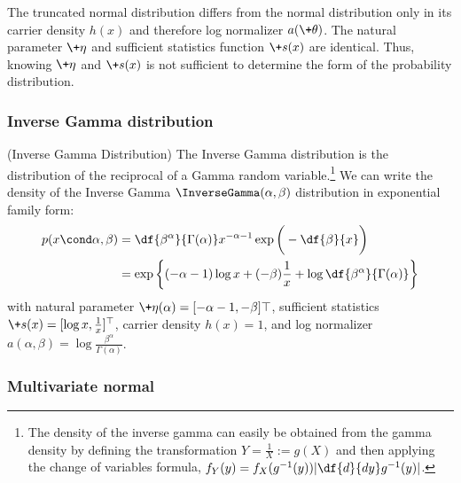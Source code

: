 \documentclass{article} %
\newcommand{\logNormalizerFunction}{a}
\newcommand{\sufficientStatsFunction}{\+s}
\newcommand{\carrierDensity}{h}
\newcommand{\param}{\+\theta}
\newcommand{\naturalParam}{\+\eta}
\begin{document}
\begin{remark}
The truncated normal distribution differs from the normal distribution only in its carrier density $\carrierDensity(x)$ and therefore log normalizer $\logNormalizerFunction(\param)$.  The natural parameter $\naturalParam$ and sufficient statistics function $\sufficientStatsFunction(x)$ are identical.   Thus,  knowing $\naturalParam$ and $\sufficientStatsFunction(x)$ is not sufficient to determine the form of the probability distribution.
\label{rk:truncated_normal_differs_from_normal_only_in_terms_of_carrier_density}
\end{remark}


\subsubsection{Inverse Gamma distribution}

\begin{example}{(Inverse Gamma Distribution)} 
\label{ex:inverse_gamma_as_ef} The Inverse Gamma distribution is the distribution of the reciprocal of a Gamma random variable.\footnote{The density of the inverse gamma can easily be obtained from the gamma density by defining the transformation $Y = \frac{1}{X} := g(X)$ and then applying the change of variables formula,  $f_Y(y) = f_X (g^{-1}(y)) | \df{d}{dy} g^{-1}(y)|$.}  We can write the density of the Inverse Gamma $\InverseGamma(\alpha,  \beta)$ distribution in exponential family form:
\begin{align*}
p (x \cond \alpha,  \beta) &= \df{\beta^\alpha}{ \Gamma (\alpha) } x^{-\alpha -1} \exp \bigg(- \df{\beta}{x} \bigg) \\
&= \exp \bigg\{ (-\alpha - 1) \log x + (- \beta) \frac{1}{x} + \log \df{\beta^\alpha}{\Gamma(\alpha)} \bigg\}
\end{align*}
with natural parameter $\naturalParam(\alpha) = [-\alpha-1,  -\beta]\top$, sufficient statistics $\sufficientStatsFunction(x) = [\log x ,  \frac{1}{x}]^\top$, carrier density $\carrierDensity(x)=1$, and log normalizer $a(\alpha,  \beta) =  \log \frac{\beta^\alpha}{\Gamma(\alpha)} $. 
  
\end{example} 

\subsubsection{Multivariate normal}
\end{document}
